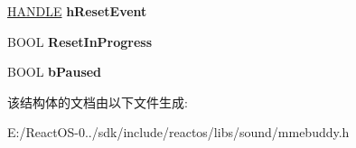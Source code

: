\begin{DoxyCompactItemize}
\hyperlink{interfacevoid}{H\+A\+N\+D\+LE} {\bfseries h\+Reset\+Event}
\item 
\mbox{\label{struct___s_o_u_n_d___d_e_v_i_c_e___i_n_s_t_a_n_c_e_a888d9fcf921fed9176bcbcd2396c4724}} 
B\+O\+OL {\bfseries Reset\+In\+Progress}
\item 
\mbox{\label{struct___s_o_u_n_d___d_e_v_i_c_e___i_n_s_t_a_n_c_e_afd3d5d88757bb670af59027e8bafcba5}} 
B\+O\+OL {\bfseries b\+Paused}
\end{DoxyCompactItemize}


该结构体的文档由以下文件生成\+:\begin{DoxyCompactItemize}
\item 
E\+:/\+React\+O\+S-\/0../sdk/include/reactos/libs/sound/mmebuddy.\+h\end{DoxyCompactItemize}
